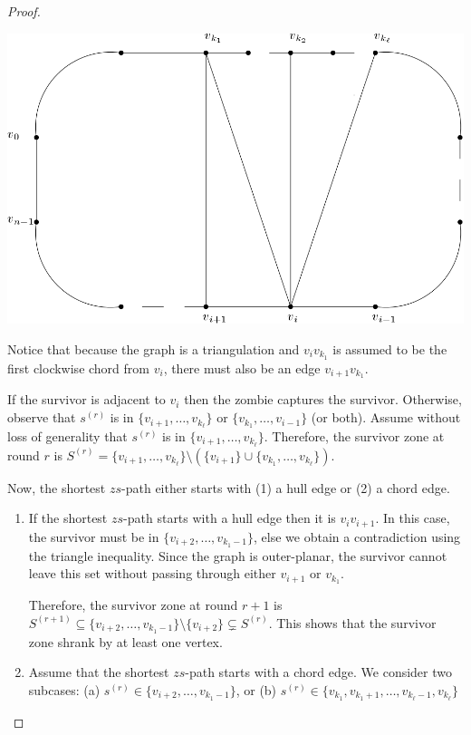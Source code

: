 \documentclass[letterpaper, 10pt]{article}
\begin{document}
\begin{proof}
  \begin{center}
  \includegraphics[scale=0.25]{survivor_zone_round_r+1_case_1}
  \end{center}

Notice that because the graph is a triangulation and $v_iv_{k_1}$ is assumed to be the first clockwise
chord from $v_i$, there must also be an edge $v_{i+1}v_{k_1}$.


If the survivor is adjacent to $v_i$ then the zombie captures the survivor.
Otherwise, observe that $s^{(r)}$ is in $\{v_{i+1}, \dots, v_{k_\ell}\}$ or
$\{v_{k_1}, \dots, v_{i-1}\}$ (or both). Assume without loss of generality that
$s^{(r)}$ is in $\{v_{i+1}, \dots, v_{k_\ell}\}$. Therefore, the survivor zone
at round $r$ is $S^{(r)} = \{v_{i+1}, \dots, v_{k_\ell}\} \setminus \left( \{v_{i+1}\} \cup \{v_{k_1}, \dots, v_{k_\ell} \} \right)$.

Now, the shortest $zs$-path either starts with (1) a hull edge or (2) a chord edge.
\begin{enumerate}
  \item If the shortest $zs$-path starts with a hull edge then it is $v_iv_{i+1}$.
  In this case, the survivor must be in $\{v_{i+2}, \dots, v_{k_1 -1 }\}$, else
  we obtain a contradiction using the triangle inequality.
  Since the graph is outer-planar, the survivor cannot leave this set without passing through
  either $v_{i+1}$ or $v_{k_1}$.


  Therefore, the survivor zone at round $r+1$ is
  $S^{(r+1)} \subseteq \{v_{i+2}, \dots, v_{k_1 -1 }\} \setminus \{v_{i+2}\} \subsetneq S^{(r)}$.
  This shows that the survivor zone shrank by at least one vertex.

  \item Assume that the shortest $zs$-path starts with a chord edge. We consider two subcases:
    (a) $s^{(r)} \in \{v_{i+2}, \dots, v_{k_1 -1} \}$, or
    (b) $s^{(r)} \in \{v_{k_1}, v_{k_1 +1}, \dots, v_{k_\ell -1}, v_{k_\ell}\}$


\end{enumerate}
\end{proof}
\end{document}
